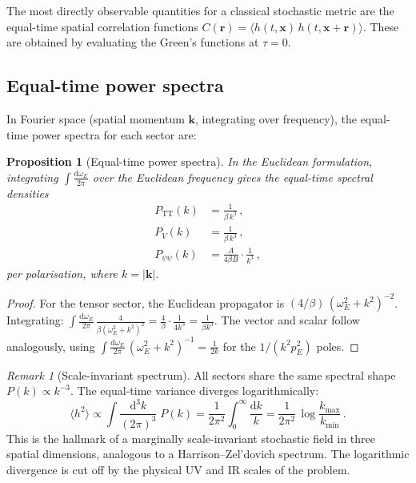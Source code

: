 \documentclass[11pt,a4paper]{article}
\newcommand{\dd}{\mathrm{d}}
\newcommand{\TT}{\mathrm{TT}}
\newtheorem{proposition}{Proposition}
\theoremstyle{definition}
\theoremstyle{remark}
\newtheorem{remark}{Remark}
\begin{document}
The most directly observable quantities for a classical stochastic metric
are the equal-time spatial correlation functions
$C(\mathbf{r}) = \langle h(t,\mathbf{x})\, h(t,\mathbf{x}+\mathbf{r})\rangle$.
These are obtained by evaluating the Green's functions at $\tau = 0$.

\subsection{Equal-time power spectra}

In Fourier space (spatial momentum $\mathbf{k}$, integrating over
frequency), the equal-time power spectra for each sector are:

\begin{proposition}[Equal-time power spectra]\label{prop:power}
In the Euclidean formulation, integrating
$\int\!\frac{\dd\omega_E}{2\pi}$ over the Euclidean frequency gives
the equal-time spectral densities
\begin{align}
  P_\TT(k) &= \frac{1}{\beta\, k^3}\,,
    \label{eq:P-TT}\\[4pt]
  P_V(k) &= \frac{1}{\beta\, k^3}\,,
    \label{eq:P-V}\\[4pt]
  P_{\psi\psi}(k) &= \frac{A}{4\beta B}\cdot\frac{1}{k^3}\,,
    \label{eq:P-psi}
\end{align}
per polarisation, where $k = |\mathbf{k}|$.
\end{proposition}

\begin{proof}
For the tensor sector, the Euclidean propagator is
$(4/\beta)\,(\omega_E^2 + k^2)^{-2}$.  Integrating:
$\int \frac{\dd\omega_E}{2\pi}\,\frac{4}{\beta(\omega_E^2+k^2)^2}
= \frac{4}{\beta}\cdot\frac{1}{4k^3} = \frac{1}{\beta k^3}$.
The vector and scalar follow analogously, using
$\int\frac{\dd\omega_E}{2\pi}\,(\omega_E^2+k^2)^{-1} = \frac{1}{2k}$
for the $1/(k^2 p_E^2)$ poles.
\end{proof}

\begin{remark}[Scale-invariant spectrum]
All sectors share the same spectral shape $P(k) \propto k^{-3}$.
The equal-time variance diverges logarithmically:
\begin{equation}
  \langle h^2 \rangle
  \propto \int \frac{\dd^3 k}{(2\pi)^3}\;P(k)
  = \frac{1}{2\pi^2}\int_0^\infty \frac{\dd k}{k}
  = \frac{1}{2\pi^2}\,\log\frac{k_{\max}}{k_{\min}}\,.
\end{equation}
This is the hallmark of a marginally scale-invariant stochastic field
in three spatial dimensions, analogous to a Harrison--Zel'dovich
spectrum.  The logarithmic divergence is cut off by the physical
UV and IR scales of the problem.
\end{remark}
\end{document}
